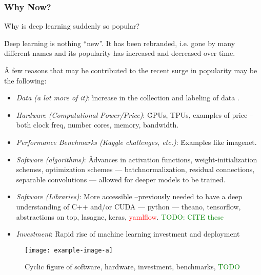\subsubsection{Why Now?}

\r{Why is deep learning suddenly so popular?}

\r{Deep learning is nothing ``new''. It has been rebranded, i.e. gone by many different names  and its popularity has increased and decreased over time.}


\r{A few reasons that may be contributed to the recent surge in popularity may be the following:}

\begin{itemize}
	
	\item \textit{Data (a lot more of it)}: \r{increase in the collection and labeling of data} .
	
	\item \textit{Hardware (Computational Power/Price)}: \r{GPUs, TPUs, examples of price -- both clock freq, number cores, memory, bandwidth}.
	
	\item \textit{Performance Benchmarks (Kaggle challenges, etc.)}: \r{Examples like imagenet}.
	
	\item \textit{Software (algorithms)}: \r{Advances in activation functions, weight-initialization schemes, optimization schemes --- batchnormalization, residual connections, separable convolutions --- allowed for deeper models to be trained.}
	
	\item \textit{Software (Libraries)}: \r{More accessible --previously needed to have a deep understanding of C++ and/or CUDA --- python --- theano, tensorflow, abstractions on top, lasagne, keras, \textcolor{red}{yamlflow}. \textcolor{green}{TODO: CITE these} }
	
	\item \textit{Investment}: \r{Rapid rise of machine learning investment and deployment}
	
\end{itemize}

\begin{figure}[htp]
	\centering
	\texttt{[image: example-image-a]}\hfil
	\caption{Cyclic figure of software, hardware, investment, benchmarks, \textcolor{green}{TODO}}
	\label{fig:cyclic_rise_of_dl_overview}
\end{figure}



